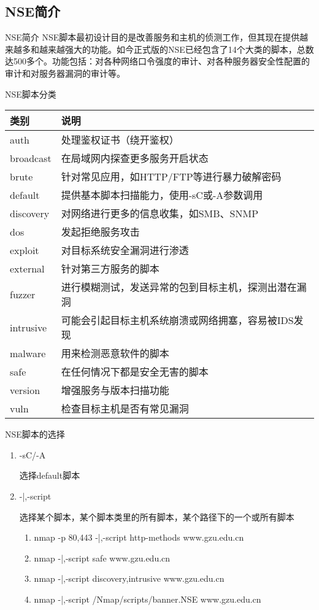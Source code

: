 \documentclass{beamer}
\begin{document}
\subsection{NSE简介}
\begin{frame}
\end{frame}
\begin{frame}{NSE简介}
NSE脚本最初设计目的是改善服务和主机的侦测工作，但其现在提供越来越多和越来越强大的功能。如今正式版的NSE已经包含了14个大类的脚本，总数达500多个。功能包括：对各种网络口令强度的审计、对各种服务器安全性配置的审计和对服务器漏洞的审计等。
\end{frame}
\begin{frame}{NSE脚本分类}
\begin{table}
\begin{tabular}{ll}
\toprule
\textbf{类别}&\textbf{说明}\\
\midrule
auth&处理鉴权证书（绕开鉴权）\\
broadcast&在局域网内探查更多服务开启状态\\
brute&针对常见应用，如HTTP/FTP等进行暴力破解密码\\
default&提供基本脚本扫描能力，使用-sC或-A参数调用\\
discovery&对网络进行更多的信息收集，如SMB、SNMP\\
dos&发起拒绝服务攻击\\
exploit&对目标系统安全漏洞进行渗透\\
external&针对第三方服务的脚本\\
fuzzer&进行模糊测试，发送异常的包到目标主机，探测出潜在漏洞\\
intrusive&可能会引起目标主机系统崩溃或网络拥塞，容易被IDS发现\\
malware&用来检测恶意软件的脚本\\
safe&在任何情况下都是安全无害的脚本\\
version&增强服务与版本扫描功能\\
vuln&检查目标主机是否有常见漏洞\\
\bottomrule
\end{tabular}
\end{table}
\end{frame}
\begin{frame}{NSE脚本的选择}
\begin{enumerate}
\item -sC/-A

选择default脚本
\item -|,-script

选择某个脚本，某个脚本类里的所有脚本，某个路径下的一个或所有脚本
\begin{enumerate}
\item nmap -p 80,443 -|,-script http-methods www.gzu.edu.cn
\item nmap -|,-script safe www.gzu.edu.cn
\item nmap -|,-script discovery,intrusive www.gzu.edu.cn
\item nmap -|,-script /Nmap/scripts/banner.NSE www.gzu.edu.cn
\end{enumerate}

\end{enumerate}

\end{frame}
\end{document}
